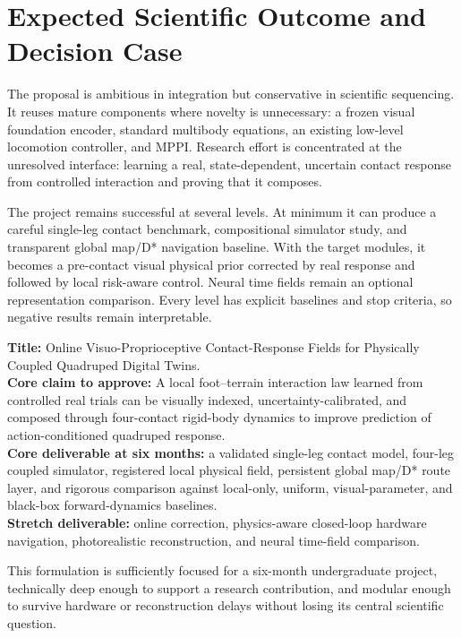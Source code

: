 \section{Expected Scientific Outcome and Decision Case}
\label{sec:decision}

The proposal is ambitious in integration but conservative in scientific sequencing. It reuses mature components where novelty is unnecessary: a frozen visual foundation encoder, standard multibody equations, an existing low-level locomotion controller, and MPPI. Research effort is concentrated at the unresolved interface: learning a real, state-dependent, uncertain contact response from controlled interaction and proving that it composes.

The project remains successful at several levels. At minimum it can produce a careful single-leg contact benchmark, compositional simulator study, and transparent global map/D* navigation baseline. With the target modules, it becomes a pre-contact visual physical prior corrected by real response and followed by local risk-aware control. Neural time fields remain an optional representation comparison. Every level has explicit baselines and stop criteria, so negative results remain interpretable.

\begin{claimbox}
\textbf{Title:} Online Visuo-Proprioceptive Contact-Response Fields for Physically Coupled Quadruped Digital Twins.\\[1mm]
\textbf{Core claim to approve:} A local foot--terrain interaction law learned from controlled real trials can be visually indexed, uncertainty-calibrated, and composed through four-contact rigid-body dynamics to improve prediction of action-conditioned quadruped response.\\[1mm]
\textbf{Core deliverable at six months:} a validated single-leg contact model, four-leg coupled simulator, registered local physical field, persistent global map/D* route layer, and rigorous comparison against local-only, uniform, visual-parameter, and black-box forward-dynamics baselines.\\[1mm]
\textbf{Stretch deliverable:} online correction, physics-aware closed-loop hardware navigation, photorealistic reconstruction, and neural time-field comparison.
\end{claimbox}

This formulation is sufficiently focused for a six-month undergraduate project, technically deep enough to support a research contribution, and modular enough to survive hardware or reconstruction delays without losing its central scientific question.
